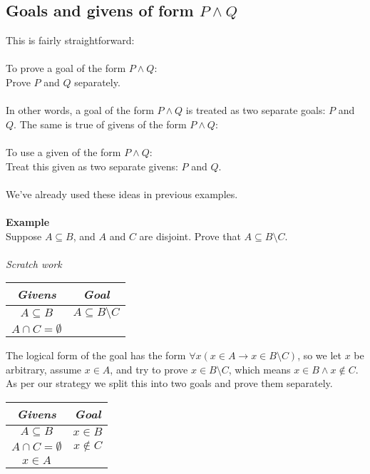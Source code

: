 \documentclass{report}
\theoremstyle{definition}
\begin{document}
\subsection{Goals and givens of form $P\land Q$}
This is fairly straightforward:\\
\vspace{1mm}\\
\indent To prove a goal of the form $P\land Q$:\\
\indent Prove $P$ and $Q$ separately.\\
\vspace{1mm}\\
In other words, a goal of the form $P\land Q$ is treated as two separate goals: $P$ and $Q$. The same is true of givens of the form $P\land Q$:\\
\vspace{1mm}\\
\indent To use a given of the form $P\land Q$:\\
\indent Treat this given as two separate givens: $P$ and $Q$.\\
\vspace{1mm}\\
We've already used these ideas in previous examples.\\
\vspace{1mm}\\
\textbf{Example}\\
Suppose $A\subseteq B$, and $A$ and $C$ are disjoint. Prove that $A\subseteq B\setminus C$.\\
\vspace{1mm}\\
\textit{Scratch work}
\begin{center}
\begin{tabular}{c|c}
\textit{Givens}&\textit{Goal}\\
\hline
$A\subseteq B$&$A\subseteq B\setminus C$\\
$A\cap C=\emptyset$&\\
\end{tabular}
\end{center}
The logical form of the goal has the form $\forall x(x\in A\to x\in B\setminus C)$, so we let $x$ be arbitrary, assume $x\in A$, and try to prove $x\in B\setminus C$, which means
$x\in B\land x\notin C$. As per our strategy we split this into two goals and prove them separately.
\begin{center}
\begin{tabular}{c|c}
\textit{Givens}&\textit{Goal}\\
\hline
$A\subseteq B$&$x\in B$\\
$A\cap C=\emptyset$&$x\notin C$\\
$x\in A$&
\end{tabular}
\end{center}
\end{document}
